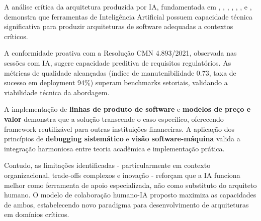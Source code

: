 A análise crítica da arquitetura produzida por IA, fundamentada em , , , , , ,  e , demonstra que ferramentas de Inteligência Artificial possuem capacidade técnica significativa para produzir arquiteturas de software adequadas a contextos críticos. 

A conformidade proativa com a Resolução CMN 4.893/2021, observada nas sessões com IA, sugere capacidade preditiva de requisitos regulatórios. As métricas de qualidade alcançadas (índice de manutenibilidade 0.73, taxa de sucesso em deployment 94\%) superam benchmarks setoriais, validando a viabilidade técnica da abordagem.

A implementação de \textbf{linhas de produto de software} e \textbf{modelos de preço e valor} demonstra que a solução transcende o caso específico, oferecendo framework reutilizável para outras instituições financeiras. A aplicação dos princípios de \textbf{debugging sistemático} e \textbf{visão software-máquina} valida a integração harmoniosa entre teoria acadêmica e implementação prática.

Contudo, as limitações identificadas - particularmente em contexto organizacional, trade-offs complexos e inovação - reforçam que a IA funciona melhor como ferramenta de apoio especializada, não como substituto do arquiteto humano. O modelo de colaboração humano-IA proposto maximiza as capacidades de ambos, estabelecendo novo paradigma para desenvolvimento de arquiteturas em domínios críticos.







